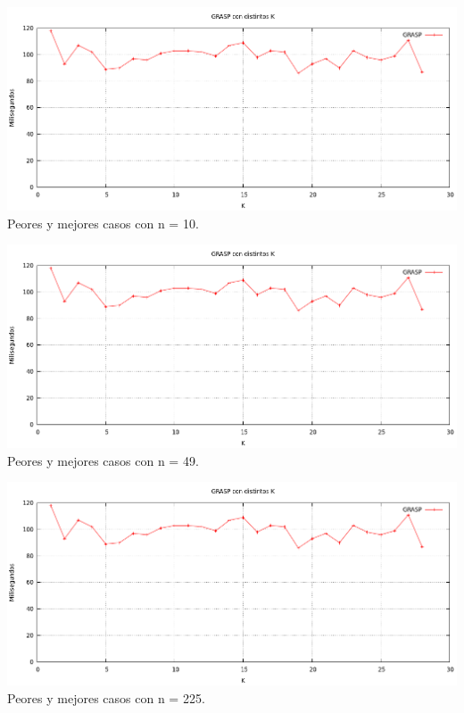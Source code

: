 \begin{center}
\includegraphics[width=15cm]{./graficos/GRASP_distintosK.png}\\
Peores y mejores casos con n = 10.
\end{center}

\begin{center}
\includegraphics[width=15cm]{./graficos/GRASP_distintosK.png}\\
Peores y mejores casos con n = 49.
\end{center}

\begin{center}
\includegraphics[width=15cm]{./graficos/GRASP_distintosK.png}\\
Peores y mejores casos con n = 225.
\end{center}

